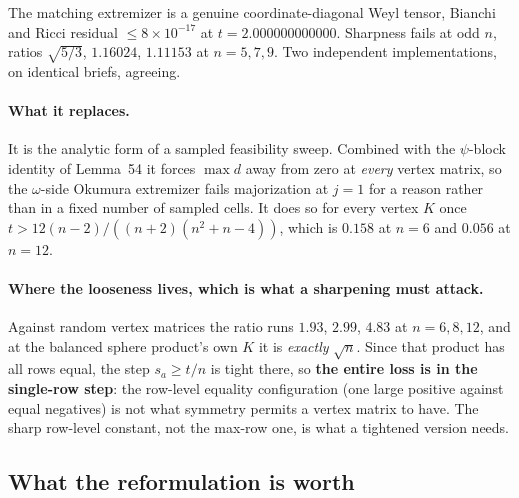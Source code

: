 \begin{certificate}
The matching extremizer is a genuine coordinate-diagonal Weyl tensor, Bianchi and Ricci residual $\le8\times10^{-17}$ at $t=2.000000000000$. Sharpness fails at odd $n$, ratios $\sqrt{5/3}$, $1.16024$, $1.11153$ at $n=5,7,9$. Two independent implementations, on identical briefs, agreeing.
\end{certificate}

\paragraph{What it replaces.} It is the analytic form of a sampled feasibility sweep. Combined with the $\psi$-block identity of Lemma~54 it forces $\max d$ away from zero at \emph{every} vertex matrix, so the $\omega$-side Okumura extremizer fails majorization at $j=1$ for a reason rather than in a fixed number of sampled cells. It does so for every vertex $K$ once $t>12(n-2)/((n+2)(n^2+n-4))$, which is $0.158$ at $n=6$ and $0.056$ at $n=12$.

\paragraph{Where the looseness lives, which is what a sharpening must attack.} Against random vertex matrices the ratio runs $1.93$, $2.99$, $4.83$ at $n=6,8,12$, and at the balanced sphere product's own $K$ it is \emph{exactly} $\sqrt n$. Since that product has all rows equal, the step $s_a\ge t/n$ is tight there, so \textbf{the entire loss is in the single-row step}: the row-level equality configuration (one large positive against equal negatives) is not what symmetry permits a vertex matrix to have. The sharp row-level constant, not the max-row one, is what a tightened version needs.

\subsection{What the reformulation is worth}

